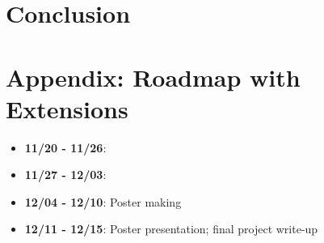 \documentclass[paper=a4, fontsize=11pt]{scrartcl} %
\numberwithin{equation}{section} %
\numberwithin{figure}{section} %
\numberwithin{table}{section} %
\begin{document}

\section{Conclusion}

\appendix
\section{Appendix: Roadmap with Extensions}
\begin{itemize}
\item \textbf{11/20 - 11/26}: 
\item \textbf{11/27 - 12/03}: 
\item \textbf{12/04 - 12/10}: Poster making
\item \textbf{12/11 - 12/15}: Poster presentation; final project write-up
\end{itemize}


 
\end{document}
